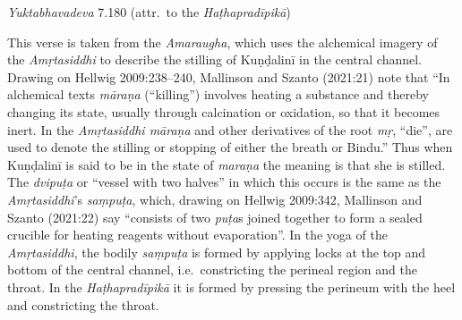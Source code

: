 \begin{ekdosis}
\begin{testimonia}[hp03_012]
\emph{Yuktabhavadeva} 7.180 (attr.~to the \emph{Haṭhapradīpikā})
\begin{versinnote}
\end{versinnote}
\end{testimonia}

\begin{philcomm}[hp03_012]
This verse is taken from the \emph{Amaraugha}, which uses the alchemical imagery of the \emph{Amṛtasiddhi} to describe the stilling of Kuṇḍalinī in the central channel. Drawing on Hellwig 2009:238–240, Mallinson and Szanto (2021:21) note that “In alchemical texts \emph{māraṇa} (“killing”) involves heating a substance and thereby changing its state, usually through calcination or oxidation, so that it becomes inert. In the \emph{Amṛtasiddhi māraṇa} and other derivatives of the root \emph{mṛ}, “die”, are used to denote the stilling or stopping of either the breath or Bindu.” Thus when Kuṇḍalinī is said to be in the state of \emph{maraṇa} the meaning is that she is stilled. The \emph{dvipuṭa} or “vessel with two halves” in which this occurs is the same as the \emph{Amṛtasiddhi}’s \emph{saṃpuṭa}, which, drawing on Hellwig 2009:342, Mallinson and Szanto (2021:22) say “consists of two \emph{puṭa}s joined together to form a sealed crucible for heating reagents without evaporation”. In the yoga of the \emph{Amṛtasiddhi}, the bodily \emph{saṃpuṭa} is formed by applying locks at the top and bottom of the central channel, i.e.~constricting the perineal region and the throat. In the \emph{Haṭhapradīpikā} it is formed by pressing the perineum with the heel and constricting the throat.


\end{philcomm}
\end{ekdosis}

